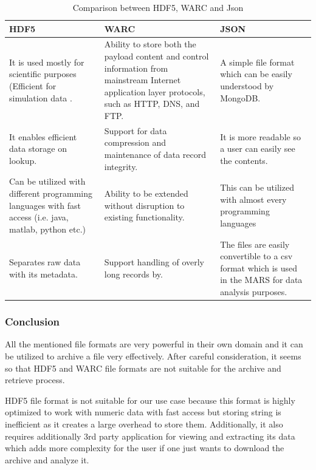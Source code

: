 \vspace*{10pt}
 \begin{table}[H]
    \centering
    \begin{tabular}{|p{4.6cm}|p{4.6cm}|p{4.6cm}|}
        \hline
            \textbf{HDF5}  & \textbf{WARC}&\textbf{JSON}\\
        \hline
            It is used mostly for scientific purposes (Efficient
            for simulation data \cite[p.~11]{Savic2007}. & 
            Ability to store both the payload content and control information from mainstream Internet application layer protocols, such as
            HTTP, DNS, and FTP. & A simple file format which can be easily understood by MongoDB.\\
        \hline
            It enables efficient data storage on lookup.
            &  
            Support for data compression and maintenance of
             data record integrity. & It is more readable so a user can easily see the contents.\\
        \hline
        Can be utilized with different programming languages with fast access (i.e. java, matlab, python etc.) &  
                Ability to be extended without disruption
                to existing functionality. & This can be utilized with almost every programming languages\\
        \hline
        Separates raw data with its metadata. & Support handling of overly long records by.& The files are easily convertible to a csv format which is used in the MARS
        for data analysis purposes. \\        
        \hline
    \end{tabular}
    \caption{Comparison between HDF5, WARC and Json}
    \label{table:Hdf5vsWARC}     
\end{table} 

\subsubsection{Conclusion}
    All the mentioned file formats are very powerful in their own domain and it can be utilized to archive a file very effectively. After careful consideration,  
    it seems so that HDF5 and WARC file formats are not suitable for the archive and retrieve process. 

    HDF5 file format is not suitable for our use case because this format is highly optimized to work with
    numeric data with fast access but storing string is inefficient as it creates a large overhead to store them. 
    Additionally, it also requires additionally 3rd party application for viewing and extracting its data which 
    adds more complexity for the user if one just wants to download the archive and analyze it. 

